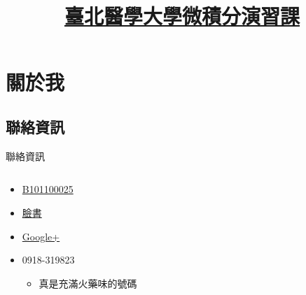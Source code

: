 


\title[微積分演習課]{\href{https://jdh8.github.io/calculus-slides/Introduction.pdf}{臺北醫學大學微積分演習課}}
\maketitle

\section{關於我}
\subsection{聯絡資訊}
\begin{frame}{聯絡資訊}
    \begin{columns}[onlytextwidth]
        \begin{column}{0.6\textwidth}
            \begin{itemize}
                \item \href{http://my2.tmu.edu.tw/b101100025}{B101100025}
                \item \href{https://www.facebook.com/jdh863}{臉書}
                \item \href{https://plus.google.com/+\%E4\%BD\%95\%E9\%9C\%87\%E9\%82\%A6-jdh8}{Google+}
                \item 0918-319823
                    \begin{itemize}
                        \item 真是充滿火藥味的號碼
                    \end{itemize}
            \end{itemize}
        \end{column}


\end{columns}
\end{frame}
